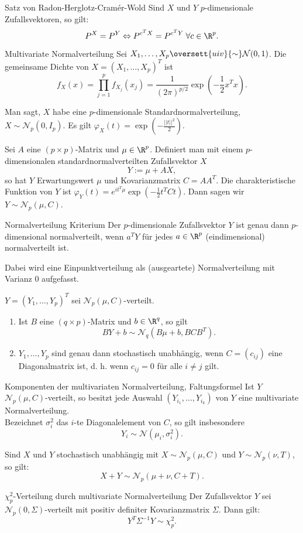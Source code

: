 \begin{karte}{Satz von Radon-Herglotz-Cramér-Wold}
Sind \(X\) und \(Y\) \(p\)-dimensionale Zufallsvektoren, so gilt: 
\[ P^X = P^Y \Leftrightarrow P^{c^T X} = P^{c^T Y} \;\forall c\in \R^p. \]
\end{karte}

\begin{karte}{Multivariate Normalverteilung}
Sei \(X_1, \ldots, X_p \oversett{uiv}{\sim} \mathcal{N}(0,1)\). Die gemeinsame Dichte 
von \(X = (X_1, \ldots, X_p)^T\) ist 
\[ f_X(x) = \prod_{j=1}^p f_{X_j}(x_j) = \frac{1}{(2\pi)^{p/2}} \exp\left( -\frac{1}{2} x^T x \right). \]

Man sagt, \(X\) habe eine \(p\)-dimensionale Standardnormalverteilung, \(X \sim \mathcal{N}_p(0, I_p)\). 
Es gilt \(\varphi_X(t) = \exp\left( -\frac{||t||^2}{2} \right)\). 

Sei \(A\) eine \((p\times p)\)-Matrix und \(\mu\in \R^p\). Definiert man mit einem \(p\)-dimensionalen 
standardnormalverteilten Zufallsvektor \(X\) 
\[ Y := \mu + A X, \]
so hat \(Y\) Erwartungswert \(\mu\) und Kovarianzmatrix \(C = A A^T\). Die charakteristische 
Funktion von \(Y\) ist \(\varphi_Y(t) = e^{i t^T \mu} \exp\left( -\frac{1}{2} t^T C t \right)\).
Dann sagen wir \(Y\sim \mathcal{N}_p(\mu, C)\).
\end{karte}

\begin{karte}{Normalverteilung Kriterium}
Der \(p\)-dimensionale Zufallsvektor \(Y\) ist genau dann \(p\)-dimensional 
normalverteilt, wenn \(a^T Y\) für jedes \(a\in \R^p\) (eindimensional) normalverteilt ist. 

Dabei wird eine Einpunktverteilung als (ausgeartete) Normalverteilung mit Varianz \(0\) aufgefasst.

\(Y = (Y_1, \ldots, Y_p)^T\) sei \(\mathcal{N}_p(\mu, C)\)-verteilt. 
\begin{enumerate}
    \item Ist \(B\) eine \((q\times p)\)-Matrix und \(b \in \R^q\), so gilt 
    \[ BY + b \sim \mathcal{N}_q(B \mu + b, BCB^T). \]
    \item \(Y_1, \ldots, Y_p\) sind genau dann stochastisch unabhängig, wenn \(C = (c_{ij})\) 
    eine Diagonalmatrix ist, d. h. wenn \(c_{ij} = 0\) für alle \(i\neq j\) gilt.
\end{enumerate}
\end{karte}

\begin{karte}{Komponenten der multivariaten Normalverteilung, Faltungsformel}
Ist \(Y\) \(\mathcal{N}_p(\mu, C)\)-verteilt, so besitzt jede Auswahl \((Y_{i_1}, \ldots, Y_{i_k})\) 
von \(Y\) eine multivariate Normalverteilung. \\
Bezeichnet \(\sigma_i^2\) das \(i\)-te Diagonalelement von \(C\), so gilt insbesondere 
\[ Y_i \sim \mathcal{N}(\mu_i, \sigma_i^2). \]

Sind \(X\) und \(Y\) stochastisch unabhängig mit \(X \sim \mathcal{N}_p(\mu, C)\) 
und \(Y \sim \mathcal{N}_p(\nu, T)\), so gilt: 
\[ X + Y \sim \mathcal{N}_p(\mu + \nu, C + T). \]
\end{karte}

\begin{karte}{\(\chi_p^2\)-Verteilung durch multivariate Normalverteilung}
Der Zufallsvektor \(Y\) sei \(\mathcal{N}_p(0, \Sigma)\)-verteilt mit positiv 
definiter Kovarianzmatrix \(\Sigma\). Dann gilt: 
\[ Y^T \Sigma^{-1} Y \sim \chi_p^2. \]
\end{karte}